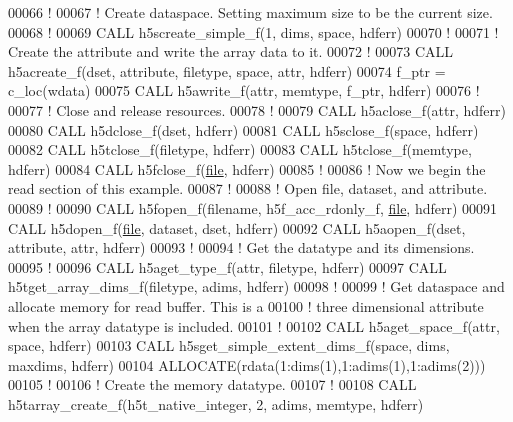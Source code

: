 \begin{DoxyCode}
00066   \textcolor{comment}{!}
00067   \textcolor{comment}{! Create dataspace.  Setting maximum size to be the current size.}
00068   \textcolor{comment}{!}
00069   \textcolor{keyword}{CALL }h5screate\_simple\_f(1, dims, space, hdferr)
00070   \textcolor{comment}{!}
00071   \textcolor{comment}{! Create the attribute and write the array data to it.}
00072   \textcolor{comment}{!}
00073   \textcolor{keyword}{CALL }h5acreate\_f(dset, attribute, filetype, space, attr, hdferr)
00074   f\_ptr = c\_loc(wdata)
00075   \textcolor{keyword}{CALL }h5awrite\_f(attr, memtype, f\_ptr, hdferr)
00076   \textcolor{comment}{!}
00077   \textcolor{comment}{! Close and release resources.}
00078   \textcolor{comment}{!}
00079   \textcolor{keyword}{CALL }h5aclose\_f(attr, hdferr)
00080   \textcolor{keyword}{CALL }h5dclose\_f(dset, hdferr)
00081   \textcolor{keyword}{CALL }h5sclose\_f(space, hdferr)
00082   \textcolor{keyword}{CALL }h5tclose\_f(filetype, hdferr)
00083   \textcolor{keyword}{CALL }h5tclose\_f(memtype, hdferr)
00084   \textcolor{keyword}{CALL }h5fclose\_f(\hyperlink{structfile}{file}, hdferr)
00085   \textcolor{comment}{!}
00086   \textcolor{comment}{! Now we begin the read section of this example. }
00087   \textcolor{comment}{!}
00088   \textcolor{comment}{! Open file, dataset, and attribute.}
00089   \textcolor{comment}{!}
00090   \textcolor{keyword}{CALL }h5fopen\_f(filename, h5f\_acc\_rdonly\_f, \hyperlink{structfile}{file}, hdferr)
00091   \textcolor{keyword}{CALL }h5dopen\_f(\hyperlink{structfile}{file}, dataset, dset, hdferr)
00092   \textcolor{keyword}{CALL }h5aopen\_f(dset, attribute, attr, hdferr)
00093   \textcolor{comment}{!}
00094   \textcolor{comment}{! Get the datatype and its dimensions.}
00095   \textcolor{comment}{!}
00096   \textcolor{keyword}{CALL }h5aget\_type\_f(attr, filetype, hdferr)
00097   \textcolor{keyword}{CALL }h5tget\_array\_dims\_f(filetype, adims, hdferr)
00098   \textcolor{comment}{!}
00099   \textcolor{comment}{! Get dataspace and allocate memory for read buffer.  This is a}
00100   \textcolor{comment}{! three dimensional attribute when the array datatype is included.}
00101   \textcolor{comment}{!}
00102   \textcolor{keyword}{CALL }h5aget\_space\_f(attr, space, hdferr)
00103   \textcolor{keyword}{CALL }h5sget\_simple\_extent\_dims\_f(space, dims, maxdims, hdferr)
00104   \textcolor{keyword}{ALLOCATE}(rdata(1:dims(1),1:adims(1),1:adims(2)))
00105   \textcolor{comment}{!}
00106   \textcolor{comment}{! Create the memory datatype.}
00107   \textcolor{comment}{! }
00108   \textcolor{keyword}{CALL }h5tarray\_create\_f(h5t\_native\_integer, 2, adims, memtype, hdferr)

\end{DoxyCode}
